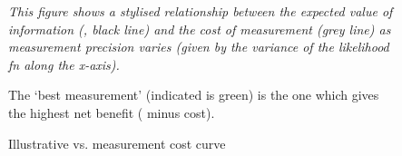 \begin{figure}[h]
{
    }
    \vspace*{-0.25cm}
    \caption{Illustrative  vs. measurement cost curve} \label{fig:methodology-EVII-precision-cost-curve}
    \vspace*{0.15cm}
    \begin{singlespace}
      \raggedright
      \footnotesize{\it This figure shows a stylised relationship between the expected value of information (, black line) and the cost of measurement (grey line) as measurement precision varies (given by the variance of the likelihood fn along the x-axis).

      The `best measurement' (indicated is green) is the one which gives the highest net benefit ( minus cost).}
    \end{singlespace}
\end{figure}